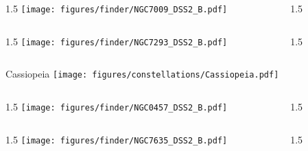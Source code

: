 \documentclass[final]{beamer}
\newlength{\colwidth}
\begin{document}

\begin{frame}[t]{}
    \begin{columns}[T]
        \begin{column}{1.5\colwidth}
            \centering
            \texttt{[image: figures/finder/NGC7009\_DSS2\_B.pdf]}
        \end{column}
        \begin{column}{1.5\colwidth}
            \Large
            
        \end{column}
    \end{columns}
    \vspace{\fill}
    \begin{columns}[T]
        \begin{column}{1.5\colwidth}
            \centering
            \texttt{[image: figures/finder/NGC7293\_DSS2\_B.pdf]}
        \end{column}
        \begin{column}{1.5\colwidth}
            \Large
            
        \end{column}
    \end{columns}
\end{frame}

\begin{frame}[t]{\LARGE Cassiopeia}
    \centering
    \texttt{[image: figures/constellations/Cassiopeia.pdf]}
\end{frame}


\begin{frame}[t]{}
    \begin{columns}[T]
        \begin{column}{1.5\colwidth}
            \centering
            \texttt{[image: figures/finder/NGC0457\_DSS2\_B.pdf]}
        \end{column}
        \begin{column}{1.5\colwidth}
            \Large
            
        \end{column}
    \end{columns}
    \vspace{\fill}
    \begin{columns}[T]
        \begin{column}{1.5\colwidth}
            \centering
            \texttt{[image: figures/finder/NGC7635\_DSS2\_B.pdf]}
        \end{column}
        \begin{column}{1.5\colwidth}
            \Large
            
        \end{column}
    \end{columns}
\end{frame}
\end{document}
